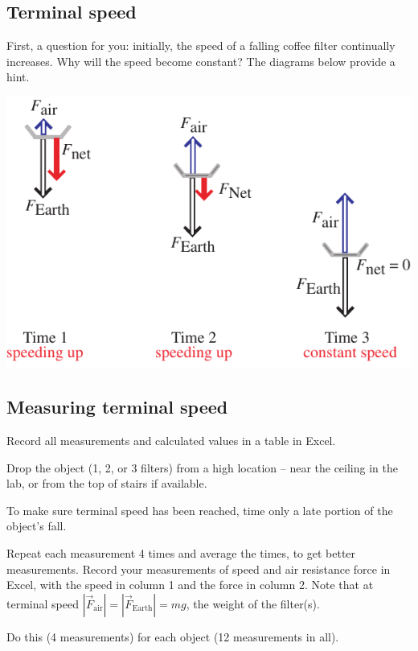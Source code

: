 \documentclass[11pt]{article}
\begin{document}
\subsection{Terminal speed}

\begin{compactitem}[\color{MIBlue}$\bullet$]
\item First, a question for you: initially, the speed of a falling coffee filter continually increases. Why will the speed become constant?  The diagrams
below provide a hint.
\end{compactitem}

\begin{center}
\includegraphics{Filter_forces.pdf}
\end{center}

\newpage
\subsection{Measuring terminal speed}
Record all measurements and calculated values in a table in Excel.\\

\begin{compactitem}[\color{MIRed}$\Rightarrow$]
\item Drop the object (1, 2, or 3 filters) from a high location -- near the ceiling in the lab, or from the top of stairs if available.
\item To make sure terminal speed has been reached, time only a late portion of the object's fall.
\item Repeat each measurement 4 times and average the times, to get better measurements. Record your measurements of speed and air resistance force in Excel, with the speed in column 1 and the force in column 2. Note that at terminal speed $\left|\vec{F}_{ \text{air}}\right| = \left|\vec{F}_{\text{Earth}}\right| = mg$, the weight of the filter(s).
\item Do this (4 measurements) for each object (12 measurements in all).
\end{compactitem}
\end{document}
